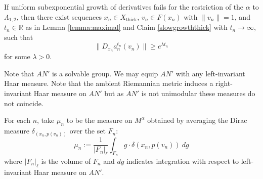 \documentclass[10pt,reqno]{amsart}
\theoremstyle{Theorem}
\theoremstyle{definition}
\newtheorem{definition}[theorem]{Definition}
\theoremstyle{remark}
\newcommand{\note}[1]{\marginpar{{\color{red}\footnotesize \begin{spacing}{1}#1\end{spacing}}}}
\newcommand{\R}{\mathbb {R}}
\newcommand{\Xt}{X_{\mathrm{thick}}}
\begin{document}
If  uniform subexponential growth of derivatives fails for the restriction of the  $\alpha$ to $\Lambda_{1,2}$, then  there exist sequences $x_n\in \Xt$,   $v_n\in F(x_n)$  with $\|v_n\| = 1$, and $t_n \in \R$
as in Lemma \ref{lemma:maximal} and Claim \ref{slowgrowththick} with $t_n\to \infty$,   such that \begin{equation}\label{eq:cleansingDeluge}\|D_{x_n}a_n^{t_n}(v_n)\| \geq e^{\lambda t_n}\end{equation} for some $\lambda >0$.


Note that $AN'$ is a solvable group.  We may equip $AN'$ with any left-invariant Haar measure.  Note that the ambient Riemannian metric induces a right-invariant Haar measure on $AN'$ but as $AN'$ is not unimodular these measures do not coincide.

For each $n$, take  $ \mu _n$ to be the measure on $M^\alpha$    obtained by averaging the Dirac measure $\delta_{(x_n,p(v_n))}$  over the set $F_n$: %
$$  \mu _n:= \frac{1}{|F_n|_\ell} \int _{F_n}  g \cdot \delta(x_n, p(v_n))  \ d g$$
where $|F_n|_\ell$ is the volume of $F_n$ and $dg $ indicates integration with respect to left-invariant Haar measure on  $AN'$.
\end{document}
